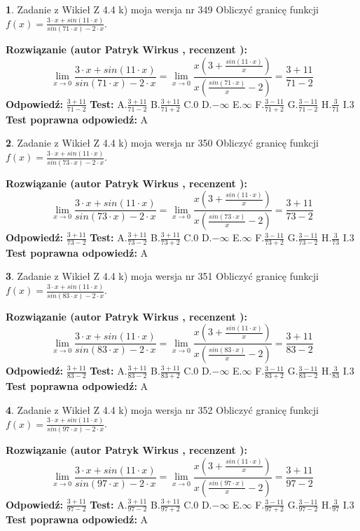 \documentclass[12pt, a4paper]{article}
\theoremstyle{definition} %
\newtheorem{zad}{}
\newcommand{\zadStart}[1]{\begin{zad}#1\newline}
\newcommand{\zadStop}{\end{zad}}
\newcommand{\rozwStart}[2]{\noindent \textbf{Rozwiązanie (autor #1 , recenzent #2): }\newline}
\newcommand{\rozwStop}{\newline}
\newcommand{\odpStart}{\noindent \textbf{Odpowiedź:}\newline}
\newcommand{\odpStop}{\newline}
\newcommand{\testStart}{\noindent \textbf{Test:}\newline}
\newcommand{\testStop}{\newline}
\newcommand{\kluczStart}{\noindent \textbf{Test poprawna odpowiedź:}\newline}
\newcommand{\kluczStop}{\newline}
\begin{document}
\zadStart{Zadanie z Wikieł Z 4.4 k) moja wersja nr 349}
Obliczyć granicę funkcji $f(x)=\frac{3\cdot x +sin(11\cdot x)}{sin(71\cdot x) -2\cdot x}$.
\zadStop
\rozwStart{Patryk Wirkus}{}
$$\lim\limits_{x\to 0}\frac{3\cdot x +sin(11\cdot x)}{sin(71\cdot x) -2\cdot x}
=\lim\limits_{x\to 0}\frac{x(3+\frac{sin(11\cdot x)}{x})}{x(\frac{sin(71\cdot x)}{x}-2)}
=\frac{3+11}{71-2}$$
\rozwStop
\odpStart
$\frac{3+11}{71-2}$
\odpStop
\testStart
A.$\frac{3+11}{71-2}$
B.$\frac{3+11}{71+2}$
C.$0$
D.$-\infty$
E.$\infty$
F.$\frac{3-11}{71+2}$
G.$\frac{3-11}{71-2}$
H.$\frac{3}{71}$
I.$3$
\testStop
\kluczStart
A
\kluczStop



\zadStart{Zadanie z Wikieł Z 4.4 k) moja wersja nr 350}
Obliczyć granicę funkcji $f(x)=\frac{3\cdot x +sin(11\cdot x)}{sin(73\cdot x) -2\cdot x}$.
\zadStop
\rozwStart{Patryk Wirkus}{}
$$\lim\limits_{x\to 0}\frac{3\cdot x +sin(11\cdot x)}{sin(73\cdot x) -2\cdot x}
=\lim\limits_{x\to 0}\frac{x(3+\frac{sin(11\cdot x)}{x})}{x(\frac{sin(73\cdot x)}{x}-2)}
=\frac{3+11}{73-2}$$
\rozwStop
\odpStart
$\frac{3+11}{73-2}$
\odpStop
\testStart
A.$\frac{3+11}{73-2}$
B.$\frac{3+11}{73+2}$
C.$0$
D.$-\infty$
E.$\infty$
F.$\frac{3-11}{73+2}$
G.$\frac{3-11}{73-2}$
H.$\frac{3}{73}$
I.$3$
\testStop
\kluczStart
A
\kluczStop



\zadStart{Zadanie z Wikieł Z 4.4 k) moja wersja nr 351}
Obliczyć granicę funkcji $f(x)=\frac{3\cdot x +sin(11\cdot x)}{sin(83\cdot x) -2\cdot x}$.
\zadStop
\rozwStart{Patryk Wirkus}{}
$$\lim\limits_{x\to 0}\frac{3\cdot x +sin(11\cdot x)}{sin(83\cdot x) -2\cdot x}
=\lim\limits_{x\to 0}\frac{x(3+\frac{sin(11\cdot x)}{x})}{x(\frac{sin(83\cdot x)}{x}-2)}
=\frac{3+11}{83-2}$$
\rozwStop
\odpStart
$\frac{3+11}{83-2}$
\odpStop
\testStart
A.$\frac{3+11}{83-2}$
B.$\frac{3+11}{83+2}$
C.$0$
D.$-\infty$
E.$\infty$
F.$\frac{3-11}{83+2}$
G.$\frac{3-11}{83-2}$
H.$\frac{3}{83}$
I.$3$
\testStop
\kluczStart
A
\kluczStop



\zadStart{Zadanie z Wikieł Z 4.4 k) moja wersja nr 352}
Obliczyć granicę funkcji $f(x)=\frac{3\cdot x +sin(11\cdot x)}{sin(97\cdot x) -2\cdot x}$.
\zadStop
\rozwStart{Patryk Wirkus}{}
$$\lim\limits_{x\to 0}\frac{3\cdot x +sin(11\cdot x)}{sin(97\cdot x) -2\cdot x}
=\lim\limits_{x\to 0}\frac{x(3+\frac{sin(11\cdot x)}{x})}{x(\frac{sin(97\cdot x)}{x}-2)}
=\frac{3+11}{97-2}$$
\rozwStop
\odpStart
$\frac{3+11}{97-2}$
\odpStop
\testStart
A.$\frac{3+11}{97-2}$
B.$\frac{3+11}{97+2}$
C.$0$
D.$-\infty$
E.$\infty$
F.$\frac{3-11}{97+2}$
G.$\frac{3-11}{97-2}$
H.$\frac{3}{97}$
I.$3$
\testStop
\kluczStart
A
\kluczStop
\end{document}
